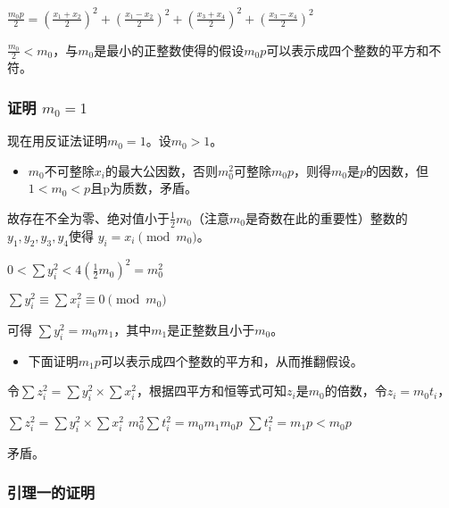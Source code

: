 \documentclass[
]{ctexart}
\providecommand{\tightlist}{%
  \setlength{\itemsep}{0pt}\setlength{\parskip}{0pt}}
\begin{document}
\(\frac{m_0 p}{2} = \left(\frac{x_1+x_2}{2}\right)^2 + \left(\frac{x_1-x_2}{2}\right)^2 + \left(\frac{x_3+x_4}{2}\right)^2 + \left(\frac{x_3-x_4}{2}\right)^2\)

\(\frac{m_0}{2} < m_0\)，与\(m_0\)是最小的正整数使得的假设\(m_0 p\)可以表示成四个整数的平方和不符。

\subsubsection{\texorpdfstring{证明
		\(m_0 = 1\)}{证明 m\_0 = 1}}\label{ux8b49ux660e_m_0_1}

现在用反证法证明\(m_0 = 1\)。设\(m_0 > 1\)。

\begin{itemize}
	\tightlist
	\item
		\(m_0\)不可整除\(x_i\)的最大公因数，否则\(m_0^2\)可整除\(m_0 p\)，则得\(m_0\)是\(p\)的因数，但\(1 < m_0 < p\)且p为质数，矛盾。
\end{itemize}

故存在不全为零、绝对值小于\(\frac{1}{2} m_0\)（注意\(m_0\)是奇数在此的重要性）整数的\(y_1,y_2,y_3,y_4\)使得
\(y_i = x_i \pmod{m_0}\)。

\begin{description}
	\tightlist
	\item[]
		\(0 < \sum y_i^2 < 4 (\frac{1}{2} m_0 )^2 = m_0^2\)

		\(\sum y_i^2 \equiv \sum x_i^2 \equiv 0 \pmod{m_0}\)
\end{description}

可得 \(\sum y_i^2  = m_0 m_1\)，其中\(m_1\)是正整数且小于\(m_0\)。

\begin{itemize}
	\tightlist
	\item
		下面证明\(m_1 p\)可以表示成四个整数的平方和，从而推翻假设。
\end{itemize}

令\(\sum z_i^2 = \sum y_i^2 \times \sum x_i^2\)，根据四平方和恒等式可知\(z_i\)是\(m_0\)的倍数，令\(z_i = m_0 t_i\)，

\begin{description}
	\tightlist
	\item[]
		\(\sum z_i^2 = \sum y_i^2 \times \sum x_i^2\)
		\(m_0^2 \sum t_i^2 = m_0 m_1 m_0 p\)
		\(\sum t_i^2 = m_1 p < m_0 p\)
\end{description}

矛盾。

\subsubsection{引理一的证明}\label{ux5f15ux7406ux4e00ux7684ux8b49ux660e}
\end{document}
